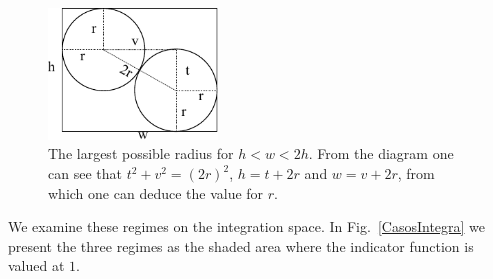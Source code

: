 \documentclass[superscriptaddress,pre,reprint,showpacs,twocolumn]{revtex4-1}
\begin{document}
\begin{figure}[h]
  \centering
  \includegraphics[width=0.4\textwidth]{figures/DiagramaRadioMaximo.pdf}
  \caption{The largest possible radius for $h<w<2h$. From the diagram
    one can see that $t^2+v^2=(2r)^2$, $h=t+2r$ and $w=v+2r$, from which
    one can deduce the value for $r$.}
  \label{radiomaximo}
\end{figure}

We examine these regimes on the integration space.
In Fig.~\ref{CasosIntegra} we present the three regimes as
the shaded area where the indicator function is valued at $1$.
\end{document}
